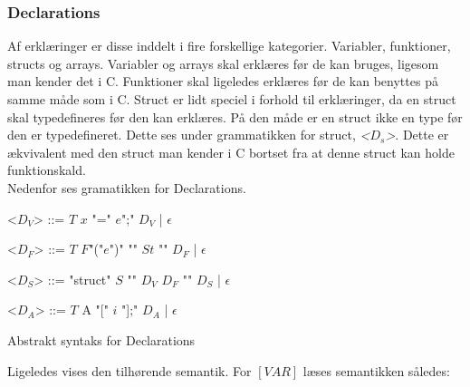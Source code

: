 \noindent \subsubsection{Declarations}
Af erklæringer er disse inddelt i fire forskellige kategorier. Variabler, funktioner, structs og arrays. 
Variabler og arrays skal erklæres før de kan bruges, ligesom man kender det i C. Funktioner skal ligeledes erklæres før de kan benyttes på samme måde som i C. Struct er lidt speciel i forhold til erklæringer, da en struct skal typedefineres før den kan erklæres. På den måde er en struct ikke en type før den er typedefineret. Dette ses under grammatikken for struct,  \textit{<$D_s$>}. Dette er ækvivalent med den struct man kender i C bortset fra at denne struct kan holde funktionskald.\\

\noindent Nedenfor ses gramatikken for Declarations.

\begin{Grammar}
 \begin{grammar}
 <$D_V$> ::= $T$ $x$ "=" $e$";" $D_V$ | $\epsilon$
 
 <$D_F$> ::= $T$ $F$"("$e$")" "{" $St$ "}" $D_F$ | $\epsilon$
 
 <$D_S$> ::= "struct" $S$ "{" $D_V$ $D_F$ "}" $D_S$ | $\epsilon$
 
 <$D_A$> ::= $T$ A "[" $i$ "];" $D_A$ | $\epsilon$
 \end{grammar}
 \caption{Abstrakt syntaks for Declarations}\label{gra:declarations}
\end{Grammar}

\noindent Ligeledes vises den tilhørende semantik. For $[VAR]$ læses semantikken således:
